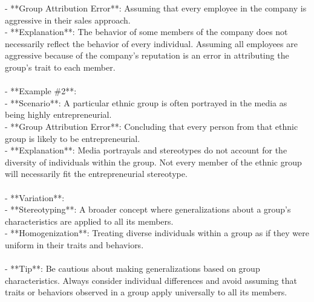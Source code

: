 \documentclass[a4paper,12pt,single,pdftex]{scrartcl}
\begin{document}
    
        - **Group Attribution Error**: Assuming that every employee in the company is aggressive in their sales approach.
    \\

    
        - **Explanation**: The behavior of some members of the company does not necessarily reflect the behavior of every individual. Assuming all employees are aggressive because of the company's reputation is an error in attributing the group's trait to each member.
    \\

    
      
    \\

    
      - **Example \#2**:
    \\

    
        - **Scenario**: A particular ethnic group is often portrayed in the media as being highly entrepreneurial.
    \\

    
        - **Group Attribution Error**: Concluding that every person from that ethnic group is likely to be entrepreneurial.
    \\

    
        - **Explanation**: Media portrayals and stereotypes do not account for the diversity of individuals within the group. Not every member of the ethnic group will necessarily fit the entrepreneurial stereotype.
    \\

    
      
    \\

    
      - **Variation**:
    \\

    
        - **Stereotyping**: A broader concept where generalizations about a group’s characteristics are applied to all its members.
    \\

    
        - **Homogenization**: Treating diverse individuals within a group as if they were uniform in their traits and behaviors.
    \\

    
      
    \\

    
      - **Tip**: Be cautious about making generalizations based on group characteristics. Always consider individual differences and avoid assuming that traits or behaviors observed in a group apply universally to all its members.
    \\
\end{document}
